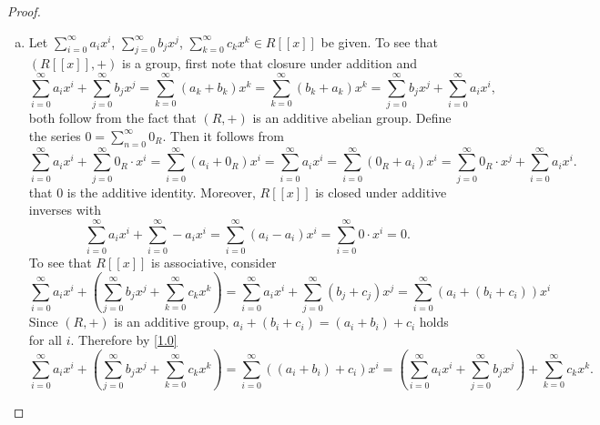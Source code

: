\documentclass[10pt]{amsart}
\begin{document}
\begin{thm}
  \begin{proof}
    \begin{enumerate}[(a)]
    \item
      Let $\sum_{i=0}^\infty a_ix^i$, $\sum_{j=0}^\infty b_jx^j$, $\sum_{k=0}^\infty c_kx^k \in R[[x]]$ be given.
      To see that $(R[[x]], +)$ is a group, first note that closure under addition and
      $$\sum_{i=0}^\infty a_ix^i + \sum_{j=0}^\infty b_jx^j = \sum_{k=0}^\infty (a_k + b_k)x^k = \sum_{k=0}^\infty (b_k + a_k)x^k = \sum_{j=0}^\infty b_jx^j + \sum_{i=0}^\infty a_ix^i,$$
      both follow from the fact that $(R, +)$ is an additive abelian group.
      Define the series $0 = \sum_{n=0}^\infty 0_R$.
      Then it follows from
      $$\sum_{i=0}^\infty a_ix^i + \sum_{j=0}^\infty 0_R\cdot x^i = \sum_{i=0}^\infty (a_i + 0_R)x^i = \sum_{i=0}^\infty a_ix^i = \sum_{i=0}^\infty (0_R + a_i)x^i = \sum_{j=0}^\infty 0_R\cdot x^j + \sum_{i=0}^\infty a_ix^i.$$
      that $0$ is the additive identity.
      Moreover, $R[[x]]$ is closed under additive inverses with
      $$\sum_{i=0}^\infty a_ix^i + \sum_{i=0}^\infty -a_ix^i = \sum_{i=0}^\infty (a_i - a_i)x^i = \sum_{i=0}^\infty 0\cdot x^i = 0.$$
      To see that $R[[x]]$ is associative, consider 
      \begin{equation}\label{1.0}
        \sum_{i=0}^\infty a_ix^i + \left(\sum_{j=0}^\infty b_jx^j + \sum_{k=0}^\infty c_kx^k\right)  = \sum_{i=0}^\infty a_ix^i + \sum_{j=0}^\infty (b_j + c_j)x^j = \sum_{i=0}^\infty \left(a_i + (b_i + c_i)\right)x^i
      \end{equation}
      Since $(R,+)$ is an additive group, $a_i + (b_i + c_i) = (a_i + b_i) + c_i$ holds for all $i$.
      Therefore by \eqref{1.0}
      $$\sum_{i=0}^\infty a_ix^i + \left(\sum_{j=0}^\infty b_jx^j + \sum_{k=0}^\infty c_kx^k\right) = \sum_{i=0}^\infty \left((a_i + b_i) + c_i\right)x^i= \left(\sum_{i=0}^\infty a_ix^i + \sum_{j=0}^\infty b_jx^j\right) + \sum_{k=0}^\infty c_kx^k.$$
      

\end{enumerate}
\end{proof}
\end{thm}
\end{document}
